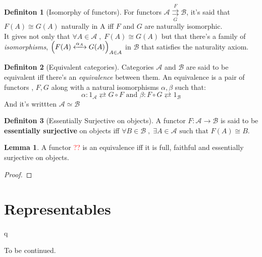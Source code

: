 \documentclass{article}
\theoremstyle{definition}
\theoremstyle{definition}
\newtheorem{definition}{Definiton}[section]
\theoremstyle{definition}
\newtheorem{lemma}{Lemma}[section]
\theoremstyle{definition}
\begin{document}
\begin{definition}[Isomorphy of functors] %
	For functors $\mathcal{A} \overset{F}{\underset{G}{\rightrightarrows}} \mathcal{B} $, it's said that $F(A) \cong G(A) $ naturally in A iff $F$ and $G$ are naturally isomorphic. \\
	It gives not only that $\forall A \in \mathcal{A}\; , \;  F(A) \cong G(A)$ but that there's a family of \textit{isomorphisms}, $\Big( F(A)\xleftrightarrow{\alpha_A \;} G(A) \Big)_{A \in \mathcal{A} }$ in $\mathcal{B} $ that satisfies the naturality axiom.
\end{definition}

\begin{definition}[Equivalent categories] %
	Categories $\mathcal{A}$ and $\mathcal{B} $ are said to be equivalent iff there's an \textit{equivalence} between them.
	An equivalence is  a pair of functors , $F,G$ along with a natural isomorphisms $\alpha, \beta$ such that:
	\[ \alpha: 1_{\mathcal{A} } \rightleftarrows G \circ F \text{ and } \beta: F \circ G \rightleftarrows 1_{\mathcal{B} } \]
	And it's writtten $\mathcal{A} \simeq \mathcal{B} $
\end{definition}

\begin{definition}[Essentially Surjective on objects] %
	A functor $F: \mathcal{A} \rightarrow \mathcal{B} $ is said to be \textbf{essentially surjective} on objects iff
	$ \forall B \in \mathcal{B} \; , \; \exists A \in \mathcal{A} \text{ such that } F(A) \cong B $.
\end{definition}
\begin{lemma}
	A functor \textcolor{red}{??} is an equivalence iff it is full, faithful and essentially surjective on objects.
	\begin{proof}

	\end{proof}
\end{lemma}



\section{Representables}
\label{sec:Representables}
q




\pagebreak
To be continued.
\end{document}
